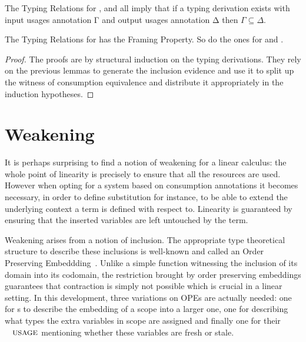 \documentclass[a4paper,UKenglish]{lipics-v2016}
\begin{document}
\begin{lemma}[Consumption]The Typing Relations for \Var{}, \Inferable{}
and \Checkable{} all imply that if a typing derivation exists with input
usages annotation Γ and output usages annotation Δ then $Γ ⊆ Δ$.
\end{lemma}

\begin{theorem}
\label{theorem:framing}
The Typing Relations for \Var{} has the Framing Property.
So do the ones for \Inferable{} and \Checkable{}.
\end{theorem}
\begin{proof}
The proofs are by structural induction on the typing derivations.
They rely on the previous lemmas to generate the inclusion evidence
and use it to split up the witness of consumption equivalence and
distribute it appropriately in the induction hypotheses.
\end{proof}


\section{Weakening}

It is perhaps surprising to find a notion of weakening for a linear
calculus: the whole point of linearity is precisely to ensure that
all the resources are used. However when opting for a system based
on consumption annotations it becomes necessary, in order to define
substitution for instance, to be able to extend the underlying
context a term is defined with respect to. Linearity is guaranteed
by ensuring that the inserted variables are left untouched by the
term.

Weakening arises from a notion of inclusion. The appropriate type
theoretical structure to describe these inclusions is well-known
and called an Order Preserving Embeddding~\cite{chapman2009thesis,altenkirch1995categorical}.
Unlike a simple function witnessing the inclusion of its domain
into its codomain, the restriction brought by order preserving
embeddings guarantees that contraction is simply not possible which
is crucial in a linear setting. In this development, three variations
on OPEs are actually needed: one for \Nat{}s to describe the embedding
of a scope into a larger one, one for \Context{} describing what types
the extra variables in scope are assigned and finally one for their
$\Usages{}$ mentioning whether these variables are fresh or stale.
\end{document}
